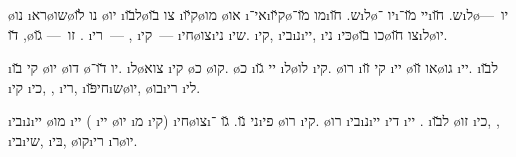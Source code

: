 
 \o{נו} \i{רא}\o{שו}\o{נו} \u{לו} \o{יו} \i{ל}\u{בו}\o{צו} \u{בו}  \i{ק}\u{יו}\o{מו} \o{או} \i{אי}־\i{ק}\u{יו}\o{מו}  \u{מו}־\i{ש}.  \u{חו}\i{ל}\o{יו}  ־\i{יי}   \u{מו}־\i{ש}.   \u{חו}\i{ל}\o{יו}~— , \u{דו}\o{זו}~—  \u{גו} . \i{רי}~— , \i{קי}~—   \i{חי}\o{צו}\i{ני} \i{שי}{\gnuvah}. \i{קי}, \i{בי}\i{נ}\i{יי}, \i{ני} \i{כּי}\o{כו}   \u{בו}\o{צו}   \u{חו}\i{ל}\o{יו}.



\i{קי}  \u{בו} \o{יו} \o{דו} \o{יו}   \u{דו}־.  \i{ל}\o{צוא} \i{קי} \o{כ} \o{קו}. \o{כ}    \i{יי} \u{גו}  \i{ל}\o{לו} \i{קי}. \o{רו} \i{קי}  \u{זו} \i{יי}  \o{או}  \u{זו}\o{גו} \i{יי}. \i{ל}\u{בו} \i{קי} \i{כי},  , \i{רי}, \i{חי}\u{פּו}\i{ש}\o{יו}, \o{בו}\i{רי} \i{לי}.



\i{בי}\i{נ}\i{יי}  \o{מו} \i{יי} ( \i{יי} \o{יו} \i{מ}  \i{קי})  \i{חי}\o{צו}\i{ני} \u{נו}. \u{גו}  ־\i{פי} \o{רו}  \i{קי}. \o{רו} \i{בי}\i{נ}\i{יי}  \i{די} \i{יי}   . \i{ל}\u{בו} \o{זו} \i{כי},  , \i{בי}\i{שי}, \i{בּי}, \o{קו}\i{רי} \i{ר}\o{יו}.


